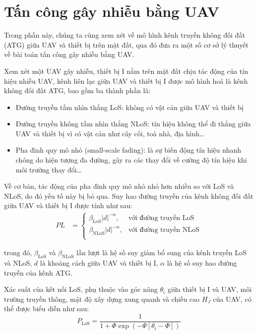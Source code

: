 \documentclass{uetgraduation}
\begin{document}
\section{Tấn công gây nhiễu bằng UAV}
Trong phần này, chúng ta cùng xem xét về mô hình kênh truyền không đối đất (ATG) giữa UAV và thiết bị trên mặt đất, qua đó đưa ra một số cơ sở lý thuyết về bài toán tấn công gây
nhiễu bằng UAV.

Xem xét một UAV gây nhiễu, thiết bị I nằm trên mặt đất chịu tác động của tín hiệu nhiễu UAV, kênh liên lạc giữa UAV và thiết bị I được mô 
hình hoá là kênh không đối đất ATG, bao gồm ba thành phần là:
\begin{itemize}
    \item Đường truyền tầm nhìn thẳng LoS: không có vật cản giữa UAV và thiết bị
    \item Đường truyền không tầm nhìn thẳng NLoS: tín hiệu không thể đi thẳng giữa UAV và thiết bị vì có vật cản như cây cối, toà nhà, địa hình\dots 
    \item Pha đinh quy mô nhỏ (small-scale fading): là sự biến động tín hiệu nhanh chóng do hiện tượng đa đường, gây ra các thay đổi về cường độ tín hiệu khi môi trường
    thay đổi\dots
\end{itemize}

Về cơ bản, tác động của pha đinh quy mô nhỏ nhỏ hơn nhiều so với LoS và NLoS, do đó yếu tố này bị bỏ qua. Suy hao đường truyền của kênh không đối đất giữa UAV và thiết
bị I được tính như sau:
\begin{align}
    PL &= \begin{cases}
        \beta_\text{LoS}|d|^{-\alpha}, & \text{với đường truyền LoS} \\
        \beta_\text{NLoS}|d|^{-\alpha}, & \text{với đường truyền NLoS} \\
    \end{cases}
    \label{eq:pathloss}
\end{align}

trong đó, $\beta_\text{LoS}$ và $\beta_\text{NLoS}$ lần lượt là hệ số suy giảm bổ sung của kênh truyền LoS và NLoS, $d$ là khoảng cách giữa UAV và thiết bị I,
$\alpha$ là hệ số suy hao đường truyền của kênh ATG.

Xác suất của kết nối LoS, phụ thuộc vào góc nâng $\theta_i$ giữa thiết bị I và UAV, môi trường truyền thông, mật độ xây dựng xung quanh và chiều cao $H_J$ của UAV,
có thể được biểu diễn như sau:
\begin{equation}
    P_\text{LoS} = \frac{1}{1 + \Phi \exp(-\Psi [\theta_i - \Phi])}
    \label{eq:plos}
\end{equation}
\end{document}
